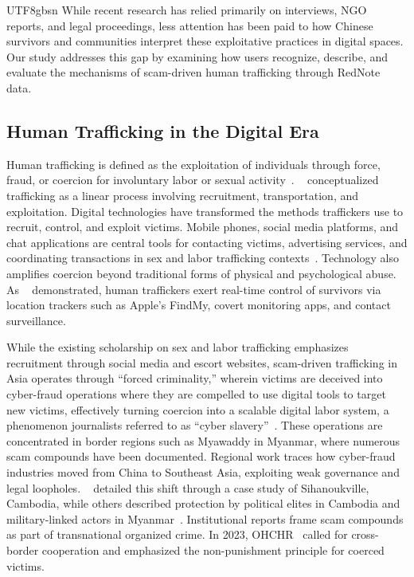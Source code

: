 \documentclass[sigconf,nonacm]{acmart}
\newcommand{\rev}[1]{#1}
\newcommand{\add}[1]{#1}
\begin{document}
\begin{CJK}{UTF8}{gbsn}
While recent research has relied primarily on interviews, NGO reports, and legal proceedings, less attention has been paid to how Chinese survivors and communities interpret these exploitative practices in digital spaces. Our study addresses this gap by examining how users recognize, describe, and evaluate the mechanisms of scam-driven human trafficking through RedNote data.

\subsection{Human Trafficking in the Digital Era}

Human trafficking is defined as the exploitation of individuals through force, fraud, or coercion for involuntary labor or sexual activity~\cite{UNODC2024trafficking}. \citeauthor{kleemans2014human}~\cite{kleemans2014human} conceptualized trafficking as a linear process involving recruitment, transportation, and exploitation. Digital technologies have transformed the methods traffickers use to recruit, control, and exploit victims. Mobile phones, social media platforms, and chat applications are central tools for contacting victims, advertising services, and coordinating transactions in sex and labor trafficking contexts~\cite{latonero2012technology}. Technology also amplifies coercion beyond traditional forms of physical and psychological abuse. As \citeauthor{stephenson2025digital}~\cite{stephenson2025digital} demonstrated, human traffickers exert real-time control of survivors via location trackers such as Apple's FindMy, covert monitoring apps, and contact surveillance. 

While the existing scholarship on sex and labor trafficking emphasizes recruitment through social media and escort websites, scam-driven trafficking in Asia operates through ``forced criminality,'' wherein victims are deceived into cyber-fraud operations where they are compelled to use digital tools to target new victims, effectively turning coercion into a scalable digital labor system, a phenomenon journalists referred to as ``cyber slavery''~\cite{hingston2023forced, hrc2022cyberslaver, sarkar2024bidirectional}. \rev{These operations are concentrated in border regions such as Myawaddy in Myanmar, where numerous scam compounds have been documented.} \add{Regional work traces how cyber-fraud industries moved from China to Southeast Asia, exploiting weak governance and legal loopholes. \citeauthor{franceschini2023compound}~\cite{franceschini2023compound} detailed this shift through a case study of Sihanoukville, Cambodia, while others described protection by political elites in Cambodia and military-linked actors in Myanmar~\cite{Loughlin2024, usip2024mekong}. Institutional reports frame scam compounds as part of transnational organized crime. In 2023, OHCHR~\cite{ohchr2023-online-scam-sea} called for cross-border cooperation and emphasized the non-punishment principle for coerced victims.}


\end{CJK}
\end{document}
